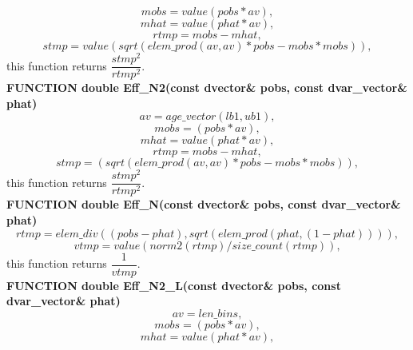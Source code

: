\documentclass{article}
\begin{document}
\begin{equation}
     mobs = value(pobs*av),
\end{equation}
\begin{equation}
    mhat = value(phat*av ),
\end{equation}
\begin{equation}
    rtmp = mobs-mhat,
\end{equation}
\begin{equation}
    stmp = value(sqrt(elem\_prod(av,av)*pobs - mobs*mobs)),
\end{equation}
this function returns $\dfrac{stmp^2}{rtmp^2}$.\\

\textbf{FUNCTION double Eff\_N2(const dvector\& pobs, const dvar\_vector\& phat)}\\
\begin{equation}
    av = age\_vector(lb1,ub1),
\end{equation}
\begin{equation}
    mobs =      (pobs*av),
\end{equation}
\begin{equation}
    mhat = value(phat*av ),
\end{equation}
\begin{equation}
    rtmp = mobs-mhat,
\end{equation}
\begin{equation}
    stmp = (sqrt(elem\_prod(av,av)*pobs - mobs*mobs)),
\end{equation}
this function returns $\dfrac{stmp^2}{rtmp^2}$.\\

\textbf{FUNCTION double Eff\_N(const dvector\& pobs, const dvar\_vector\& phat)}\\
\begin{equation}
    rtmp = elem\_div((pobs-phat),sqrt(elem\_prod(phat,(1-phat)))),
\end{equation}
\begin{equation}
    vtmp = value(norm2(rtmp)/size\_count(rtmp)),
\end{equation}
this function returns $\dfrac{1}{vtmp}$.\\


\textbf{FUNCTION double Eff\_N2\_L(const dvector\& pobs, const dvar\_vector\& phat)}\\
\begin{equation}
    av = len\_bins, 
\end{equation}
\begin{equation}
    mobs =      (pobs*av),
\end{equation}
\begin{equation}
    mhat = value(phat*av ),
\end{equation}
\end{document}
